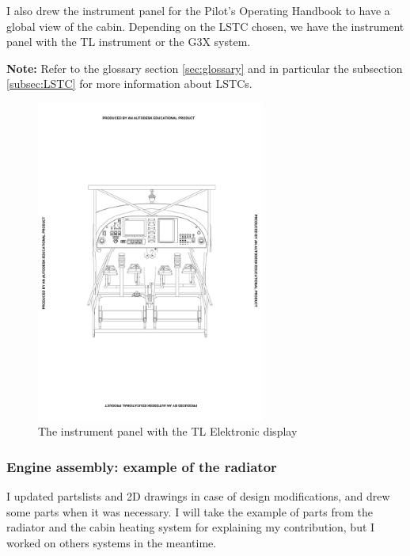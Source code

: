 \documentclass[11pt,a4paper]{article}
\begin{document}
\newpage

I also drew the instrument panel for the Pilot's Operating Handbook to have a global view of the cabin. Depending on the LSTC chosen, we have the instrument panel with the TL instrument or the G3X system.

\bigskip

\textbf{Note:} Refer to the glossary section \ref{sec:glossary} and in particular the subsection \ref{subsec:LSTC} for more information about LSTCs.

\begin{figure}[ht!]
	\begin{center}
		\includegraphics[width=7.5cm,trim = 5cm 10cm 5cm 10cm, clip]{pics/PIC006.pdf}
		\caption{The instrument panel with the TL Elektronic display}
		\label{fig:PIC006}
	\end{center}
\end{figure}

\newpage

\subsubsection{Engine assembly: example of the radiator}

I updated partslists and 2D drawings in case of design modifications, and drew some parts when it was necessary. I will take the example of parts from the radiator and the cabin heating system for explaining my contribution, but I worked on others systems in the meantime.
\end{document}
